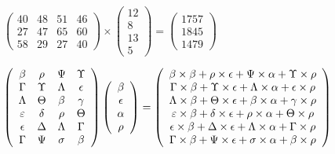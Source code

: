 \documentclass[12pt]{article}
\begin{document}
 

 
$\left( \begin{array}{ccccccccccccccc}
 40  & 
 48  & 
 51  & 
 46  \\ 
 27  & 
 47  & 
 65  & 
 60  \\ 
 58  & 
 29  & 
 27  & 
 40
\end{array}\right) \times
\left( \begin{array}{c}
 12  \\ 
 8  \\ 
 13  \\ 
 5
\end{array}\right)  =
\left( \begin{array}{c}
 1757  \\ 
 1845  \\ 
 1479
\end{array}\right)  $
 
$  %
 \left( \begin{array}
 {
 c
 c
 c
 c
 }
 \beta & 
 \rho & 
 \Psi & 
 \Upsilon \\ 
 \Gamma & 
 \Upsilon & 
 \Lambda & 
 \epsilon \\ 
 \Lambda & 
 \Theta & 
 \beta & 
 \gamma \\ 
 \varepsilon & 
 \delta & 
 \rho & 
 \Theta \\ 
 \epsilon & 
 \Delta & 
 \Lambda & 
 \Gamma \\ 
 \Gamma & 
 \Psi & 
 \sigma & 
 \beta
 \end{array} \right)
 \left( \begin{array}
 {
 c
 }
 \beta \\ 
 \epsilon \\ 
 \alpha \\ 
 \rho
 \end{array} \right)
=
  \left( \begin{array}
 {
 c
 }
 \beta \times  \beta   +  \rho \times  \epsilon   +  \Psi \times  \alpha   +  \Upsilon \times  \rho \\ 
 \Gamma \times  \beta   +  \Upsilon \times  \epsilon   +  \Lambda \times  \alpha   +  \epsilon \times  \rho \\ 
 \Lambda \times  \beta   +  \Theta \times  \epsilon   +  \beta \times  \alpha   +  \gamma \times  \rho \\ 
 \varepsilon \times  \beta   +  \delta \times  \epsilon   +  \rho \times  \alpha   +  \Theta \times  \rho \\ 
 \epsilon \times  \beta   +  \Delta \times  \epsilon   +  \Lambda \times  \alpha   +  \Gamma \times  \rho \\ 
 \Gamma \times  \beta   +  \Psi \times  \epsilon   +  \sigma \times  \alpha   +  \beta \times  \rho
 \end{array} \right)
$
 
\end{document}
